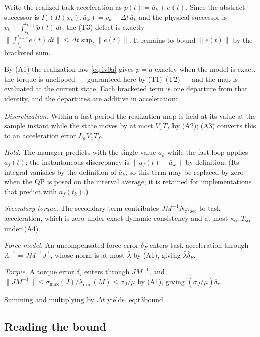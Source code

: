\documentclass[journal]{IEEEtran}
\begin{document}
\begin{IEEEproof}
Write the realized task acceleration as $\ddot p(t)=\bar a_k+e(t)$. Since the
abstract successor is $F_v(\Pi(x_k),\bar a_k)=v_k+\Delta t\,\bar a_k$ and the
physical successor is $v_k+\int_{t_k}^{t_{k+1}}\ddot p(t)\,dt$, the (T3) defect
is exactly $\bigl\|\int_{t_k}^{t_{k+1}}e(t)\,dt\bigr\|\le\Delta t\sup_t\|e(t)\|$.
It remains to bound $\|e(t)\|$ by the bracketed sum.

By (A1) the realization law \eqref{eq:iv0a} gives $\ddot p=a$ exactly when the
model is exact, the torque is unclipped --- guaranteed here by (T1)--(T2) --- and
the map is evaluated at the current state. Each bracketed term is one departure
from that identity, and the departures are additive in acceleration:

\emph{Discretization.} Within a fast period the realization map is held at its
value at the sample instant while the state moves by at most $V_xT_f$ by (A2);
(A3) converts this to an acceleration error $L_aV_xT_f$.

\emph{Hold.} The manager predicts with the single value $\bar a_k$ while the
fast loop applies $a_f(t)$; the instantaneous discrepancy is
$\|a_f(t)-\bar a_k\|$ by definition. (Its integral vanishes by the definition of
$\bar a_k$, so this term may be replaced by zero when the QP is posed on the
interval average; it is retained for implementations that predict with
$a_f(t_k)$.)

\emph{Secondary torque.} The secondary term contributes $JM^{-1}N_\tau\tau_{\mathrm{sec}}$
to task acceleration, which is zero under exact dynamic consistency and at most
$\kappa_{\mathrm{sec}}T_{\mathrm{sec}}$ under (A4).

\emph{Force model.} An uncompensated force error $\delta_F$ enters task
acceleration through $\Lambda^{-1}=JM^{-1}J^\top$, whose norm is at most
$\bar\lambda$ by (A1), giving $\bar\lambda\bar\delta_F$.

\emph{Torque.} A torque error $\delta_\tau$ enters through $JM^{-1}$, and
$\|JM^{-1}\|\le\sigma_{\max}(J)/\lambda_{\min}(M)\le\bar\sigma_J/\underline\mu$
by (A1), giving $(\bar\sigma_J/\underline\mu)\bar\delta_\tau$.

Summing and multiplying by $\Delta t$ yields \eqref{eq:t3bound}.
\end{IEEEproof}

\subsection{Reading the bound}
\end{document}
